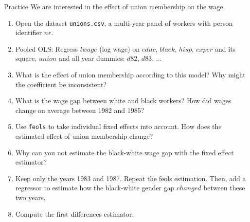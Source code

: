 \documentclass[11pt, aspectratio = 169]{beamer}
\begin{document}
\begin{frame}{Practice}
We are interested in the effect of union membership on the wage.
  \small  \begin{enumerate}
        \item Open the dataset \texttt{unions.csv}, a multi-year panel of workers with person identifier $nr$.
        
        \item Pooled OLS: Regress $lwage$ (log wage) on $educ$, $black$, $hisp$, $exper$ and its square, $union$ and all year dummies: $d82$, $d83$,  ...
        
        \item What is the effect of union membership according to this model? Why might the coefficient be inconsistent?
        
        \item What is the wage gap between white and black workers? How did wages change on average between 1982 and 1985?
        
        \item Use \texttt{feols} to take individual fixed effects into account. How does the estimated effect of union membership change?

        \item Why can you not estimate the black-white wage gap with the fixed effect estimator?

        \item  Keep only the years 1983 and 1987. Repeat the feols estimation. Then, add a regressor to estimate how the black-white gender gap $changed$ between these two years.

        \item Compute the first differences estimator. 
    \end{enumerate}
\end{frame}
\end{document}

